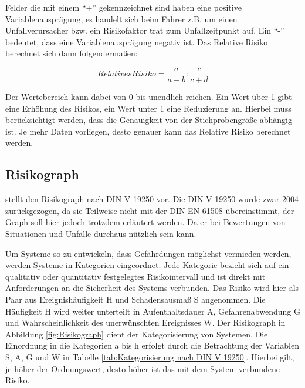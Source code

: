 Felder die mit einem \enquote{+} gekennzeichnet sind haben eine positive Variablenausprägung, es handelt sich beim Fahrer z.B. um einen Unfallverursacher bzw. ein Risikofaktor trat zum Unfallzeitpunkt auf. Ein \enquote{-} bedeutet, dass eine Variablenausprägung negativ ist. Das Relative Risiko berechnet sich dann folgendermaßen:

\begin{equation}
	Relatives Risiko = \dfrac{a}{a+b}:\dfrac{c}{c+d}
\end{equation}

Der Wertebereich kann dabei von 0 bis unendlich reichen. Ein Wert über 1 gibt eine Erhöhung des Risikos, ein Wert unter 1 eine Reduzierung an. Hierbei muss berücksichtigt werden, dass die Genauigkeit von der Stichprobengröße abhängig ist. Je mehr Daten vorliegen, desto genauer kann das Relative Risiko berechnet werden.

\subsection{Risikograph}\label{subsection:Risikograph}
\Textcite[S. 50f]{Hillenbrand.2012} stellt den Risikograph nach DIN V 19250 vor. Die DIN V 19250 wurde zwar 2004 zurückgezogen, da sie Teilweise nicht mit der DIN EN 61508 übereinstimmt, der Graph soll hier jedoch trotzdem erläutert werden. Da er bei Bewertungen von Situationen und Unfälle durchaus nützlich sein kann.

Um Systeme so zu entwickeln, dass Gefährdungen möglichst vermieden werden, werden Systeme in Kategorien eingeordnet. Jede Kategorie bezieht sich auf ein qualitativ oder quantitativ festgelegtes Risikointervall und ist direkt mit Anforderungen an die Sicherheit des Systems verbunden. Das Risiko wird hier als Paar aus Ereignishäufigkeit H und Schadensausmaß S angenommen. Die Häufigkeit H wird weiter unterteilt in Aufenthaltsdauer A, Gefahrenabwendung G und Wahrscheinlichkeit des unerwünschten Ereignisses W. Der Risikograph in Abbildung \ref{fig:Risikograph} dient der Kategorisierung von Systemen. Die Einordnung in die Kategorien a bis h erfolgt durch die Betrachtung der Variablen S, A, G und W in Tabelle \ref{tab:Kategorisierung nach DIN V 19250}. Hierbei gilt, je höher der Ordnungswert, desto höher ist das mit dem System verbundene Risiko.

